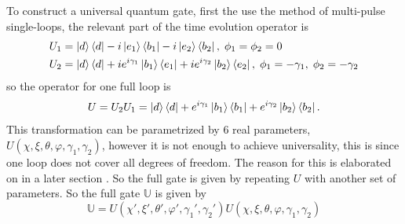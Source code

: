To construct a universal quantum gate, first the use the method of multi-pulse single-loops\cite{sLoop}, the relevant part of the time evolution operator is \begin{equation}
\begin{aligned}&
U_1 = \ket{d}\bra{d} -i\ket{e_1}\bra{b_1} -i\ket{e_2}\bra{b_2},\; \phi_1 = \phi_2 = 0
\\&
U_2 = \ket{d}\bra{d} +ie^{i\gamma_1}\ket{b_1}\bra{e_1} +ie^{i\gamma_2}\ket{b_2}\bra{e_2},\; \phi_1 = -\gamma_1,\; \phi_2 = -\gamma_2
\end{aligned}
\end{equation}
so the operator for one full loop is 
\begin{equation}
U = U_2U_1 = \ket{d}\bra{d} + e^{i\gamma_1}\ket{b_1}\bra{b_1} + e^{i\gamma_2}\ket{b_2}\bra{b_2}.
\end{equation}
This transformation can be parametrized by $6$ real parameters, $U(\chi,\xi,\theta,\varphi,\gamma_1,\gamma_2)$, however it is not enough to achieve universality, this is since one loop does not cover all degrees of freedom. The reason for this is elaborated on in a later section . So the full gate is given by repeating $U$ with another set of parameters. So the full gate $\mathbb{U}$ is given by 
\begin{equation}
\mathbb{U} = U(\chi',\xi',\theta',\varphi',\gamma_1',\gamma_2') U(\chi,\xi,\theta,\varphi,\gamma_1,\gamma_2)
\end{equation}

